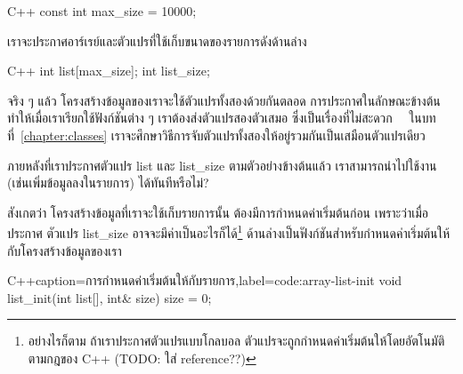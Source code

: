 \latintext
\begin{codelist}{C++}{}
const int max_size = 10000;
\end{codelist}
\thaitext

เรา{\wbr}จะ{\wbr}ประกาศ{\wbr}อาร์{\wbr}เรย์{\wbr}และ{\wbr}ตัวแปร{\wbr}ที่{\wbr}ใช้{\wbr}เก็บ{\wbr}ขนาด{\wbr}ของ{\wbr}รายการ{\wbr}ดัง{\wbr}ด้าน{\wbr}ล่าง 

\latintext
\begin{codelist}{C++}{}
int list[max_size];
int list_size;
\end{codelist}
\thaitext

จริง ๆ แล้ว โครงสร้าง{\wbr}ข้อมูล{\wbr}ของ{\wbr}เรา{\wbr}จะ{\wbr}ใช้{\wbr}ตัวแปร{\wbr}ทั้ง{\wbr}สอง{\wbr}ด้วย{\wbr}กัน{\wbr}ตลอด{\wbr}
การ{\wbr}ประกาศ{\wbr}ใน{\wbr}ลักษณะ{\wbr}ข้าง{\wbr}ต้น{\wbr}ทำให้{\wbr}เมื่อ{\wbr}เรา{\wbr}เรียก{\wbr}ใช้{\wbr}ฟังก์ชัน{\wbr}ต่าง ๆ เรา{\wbr}ต้อง{\wbr}ส่ง{\wbr}ตัวแปร{\wbr}สอง{\wbr}ตัว{\wbr}เสมอ{\wbr}
ซึ่ง{\wbr}เป็น{\wbr}เรื่อง{\wbr}ที่{\wbr}ไม่{\wbr}สะดวก \ \  ใน{\wbr}บท{\wbr}ที่~\ref{chapter:classes}
เรา{\wbr}จะ{\wbr}ศึกษา{\wbr}วิธีการ{\wbr}จับ{\wbr}ตัวแปร{\wbr}ทั้ง{\wbr}สอง{\wbr}ให้{\wbr}อยู่{\wbr}รวม{\wbr}กัน{\wbr}เป็น{\wbr}เสมือน{\wbr}ตัวแปร{\wbr}เดียว{\wbr}

\begin{quiz}{}
ภายหลัง{\wbr}ที่{\wbr}เรา{\wbr}ประกาศ{\wbr}ตัวแปร {\ct list} และ {\ct list\_size}
ตาม{\wbr}ตัวอย่าง{\wbr}ข้าง{\wbr}ต้น{\wbr}แล้ว เรา{\wbr}สามารถ{\wbr}นำ{\wbr}ไป{\wbr}ใช้งาน (เช่น{\wbr}เพิ่ม{\wbr}ข้อมูล{\wbr}ลง{\wbr}ใน{\wbr}รายการ)
ได้{\wbr}ทันที{\wbr}หรือ{\wbr}ไม่?
\end{quiz}

สังเกต{\wbr}ว่า โครงสร้าง{\wbr}ข้อมูล{\wbr}ที่{\wbr}เรา{\wbr}จะ{\wbr}ใช้{\wbr}เก็บ{\wbr}รายการ{\wbr}นั้น ต้อง{\wbr}มี{\wbr}การ{\wbr}กำหนด{\wbr}ค่า{\wbr}เริ่มต้น{\wbr}ก่อน{\wbr}
เพราะ{\wbr}ว่า{\wbr}เมื่อ{\wbr}ประกาศ ตัวแปร {\ct list\_size}
อาจ{\wbr}จะ{\wbr}มี{\wbr}ค่า{\wbr}เป็น{\wbr}อะไร{\wbr}ก็{\wbr}ได้\footnote{อย่างไร{\wbr}ก็{\wbr}ตาม ถ้า{\wbr}เรา{\wbr}ประกาศ{\wbr}ตัวแปร{\wbr}แบบ{\wbr}โกลบอล{\wbr}
  ตัวแปร{\wbr}จะ{\wbr}ถูก{\wbr}กำหนด{\wbr}ค่า{\wbr}เริ่มต้น{\wbr}ให้{\wbr}โดย{\wbr}อัตโนมัติ{\wbr}ตาม{\wbr}กฎ{\wbr}ของ C++ (TODO: ใส่ reference??)}
ด้าน{\wbr}ล่าง{\wbr}เป็น{\wbr}ฟังก์ชัน{\wbr}สำหรับ{\wbr}กำหนด{\wbr}ค่า{\wbr}เริ่มต้น{\wbr}ให้{\wbr}กับ{\wbr}โครงสร้าง{\wbr}ข้อมูล{\wbr}ของ{\wbr}เรา{\wbr}

\latintext
\begin{codelist}{C++}{caption={\thaitext การ{\wbr}กำหนด{\wbr}ค่า{\wbr}เริ่มต้น{\wbr}ให้{\wbr}กับ{\wbr}รายการ\latintext},label=code:array-list-init}
void list_init(int list[], int& size)
{
  size = 0;
}
\end{codelist}
\thaitext

